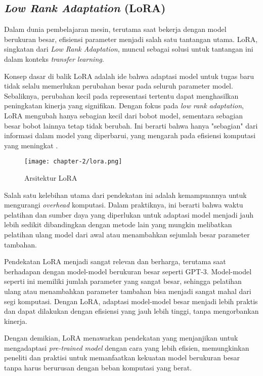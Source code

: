 \subsection{\textit{Low Rank Adaptation} (LoRA)}

Dalam dunia pembelajaran mesin, terutama saat bekerja dengan model berukuran besar, efisiensi parameter menjadi salah satu tantangan utama. LoRA, singkatan dari \textit{Low Rank Adaptation}, muncul sebagai solusi untuk tantangan ini dalam konteks \textit{transfer learning}.

Konsep dasar di balik LoRA adalah ide bahwa adaptasi model untuk tugas baru tidak selalu memerlukan perubahan besar pada seluruh parameter model. Sebaliknya, perubahan kecil pada representasi tertentu dapat menghasilkan peningkatan kinerja yang signifikan. Dengan fokus pada \textit{low rank adaptation}, LoRA mengubah hanya sebagian kecil dari bobot model, sementara sebagian besar bobot lainnya tetap tidak berubah. Ini berarti bahwa hanya "sebagian" dari informasi dalam model yang diperbarui, yang mengarah pada efisiensi komputasi yang meningkat \parencite{lora}.

\begin{figure}[ht]
    \centering
    \texttt{[image: chapter-2/lora.png]}
    \caption{Arsitektur LoRA}
    \label{fig:lora}
\end{figure}

Salah satu kelebihan utama dari pendekatan ini adalah kemampuannya untuk mengurangi \textit{overhead} komputasi. Dalam praktiknya, ini berarti bahwa waktu pelatihan dan sumber daya yang diperlukan untuk adaptasi model menjadi jauh lebih sedikit dibandingkan dengan metode lain yang mungkin melibatkan pelatihan ulang model dari awal atau menambahkan sejumlah besar parameter tambahan.

Pendekatan LoRA menjadi sangat relevan dan berharga, terutama saat berhadapan dengan model-model berukuran besar seperti GPT-3. Model-model seperti ini memiliki jumlah parameter yang sangat besar, sehingga pelatihan ulang atau menambahkan parameter tambahan bisa menjadi sangat mahal dari segi komputasi. Dengan LoRA, adaptasi model-model besar menjadi lebih praktis dan dapat dilakukan dengan efisiensi yang jauh lebih tinggi, tanpa mengorbankan kinerja.

Dengan demikian, LoRA menawarkan pendekatan yang menjanjikan untuk mengadaptasi \textit{pre-trained model} dengan cara yang lebih efisien, memungkinkan peneliti dan praktisi untuk memanfaatkan kekuatan model berukuran besar tanpa harus berurusan dengan beban komputasi yang berat.